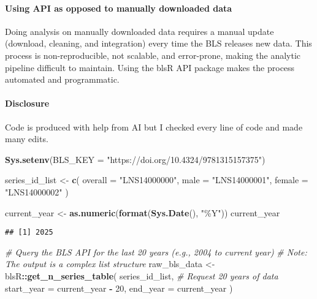\documentclass[
]{article}
\newenvironment{Shaded}{\begin{snugshade}}{\end{snugshade}}
\newcommand{\AttributeTok}[1]{\textcolor[rgb]{0.13,0.29,0.53}{#1}}
\newcommand{\CommentTok}[1]{\textcolor[rgb]{0.56,0.35,0.01}{\textit{#1}}}
\newcommand{\DecValTok}[1]{\textcolor[rgb]{0.00,0.00,0.81}{#1}}
\newcommand{\FunctionTok}[1]{\textcolor[rgb]{0.13,0.29,0.53}{\textbf{#1}}}
\newcommand{\NormalTok}[1]{#1}
\newcommand{\OtherTok}[1]{\textcolor[rgb]{0.56,0.35,0.01}{#1}}
\newcommand{\SpecialCharTok}[1]{\textcolor[rgb]{0.81,0.36,0.00}{\textbf{#1}}}
\newcommand{\StringTok}[1]{\textcolor[rgb]{0.31,0.60,0.02}{#1}}
\begin{document}
\paragraph{Using API as opposed to manually downloaded
data}\label{using-api-as-opposed-to-manually-downloaded-data}

Doing analysis on manually downloaded data requires a manual update
(download, cleaning, and integration) every time the BLS releases new
data. This process is non-reproducible, not scalable, and error-prone,
making the analytic pipeline difficult to maintain. Using the blsR API
package makes the process automated and programmatic.

\paragraph{Disclosure}\label{disclosure}

Code is produced with help from AI but I checked every line of code and
made many edits.

\begin{Shaded}
\begin{Highlighting}[]
\FunctionTok{Sys.setenv}\NormalTok{(}\AttributeTok{BLS\_KEY =} \StringTok{"https://doi.org/10.4324/9781315157375"}\NormalTok{)}

\NormalTok{series\_id\_list }\OtherTok{\textless{}{-}} \FunctionTok{c}\NormalTok{(}
  \AttributeTok{overall =} \StringTok{"LNS14000000"}\NormalTok{,}
  \AttributeTok{male    =} \StringTok{"LNS14000001"}\NormalTok{,}
  \AttributeTok{female  =} \StringTok{"LNS14000002"}
\NormalTok{)}

\NormalTok{current\_year }\OtherTok{\textless{}{-}} \FunctionTok{as.numeric}\NormalTok{(}\FunctionTok{format}\NormalTok{(}\FunctionTok{Sys.Date}\NormalTok{(), }\StringTok{"\%Y"}\NormalTok{))}
\NormalTok{current\_year}
\end{Highlighting}
\end{Shaded}

\begin{verbatim}
## [1] 2025
\end{verbatim}

\begin{Shaded}
\begin{Highlighting}[]
\CommentTok{\# Query the BLS API for the last 20 years (e.g., 2004 to current year)}
\CommentTok{\# Note: The output is a complex list structure}
\NormalTok{raw\_bls\_data }\OtherTok{\textless{}{-}}\NormalTok{ blsR}\SpecialCharTok{::}\FunctionTok{get\_n\_series\_table}\NormalTok{(}
\NormalTok{  series\_id\_list,}
  \CommentTok{\# Request 20 years of data}
  \AttributeTok{start\_year =}\NormalTok{ current\_year }\SpecialCharTok{{-}} \DecValTok{20}\NormalTok{,}
  \AttributeTok{end\_year =}\NormalTok{ current\_year}
\NormalTok{)}
\end{Highlighting}
\end{Shaded}
\end{document}
